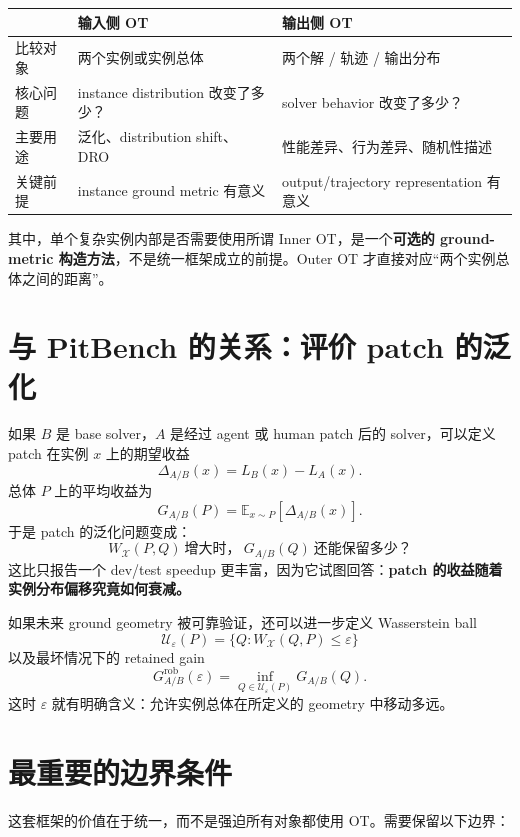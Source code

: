 \documentclass[11pt,a4paper]{ctexart}
\begin{document}
\begin{center}
\begin{tabular}{>{\raggedright\arraybackslash}p{3.2cm} >{\raggedright\arraybackslash}p{5.1cm} >{\raggedright\arraybackslash}p{5.1cm}}
\toprule
 & 输入侧 OT & 输出侧 OT \\
\midrule
比较对象 & 两个实例或实例总体 & 两个解 / 轨迹 / 输出分布 \\
核心问题 & instance distribution 改变了多少？ & solver behavior 改变了多少？ \\
主要用途 & 泛化、distribution shift、DRO & 性能差异、行为差异、随机性描述 \\
关键前提 & instance ground metric 有意义 & output/trajectory representation 有意义 \\
\bottomrule
\end{tabular}
\end{center}

其中，单个复杂实例内部是否需要使用所谓 Inner OT，是一个\textbf{可选的 ground-metric 构造方法}，不是统一框架成立的前提。Outer OT 才直接对应“两个实例总体之间的距离”。

\section{与 PitBench 的关系：评价 patch 的泛化}

如果 $B$ 是 base solver，$A$ 是经过 agent 或 human patch 后的 solver，可以定义 patch 在实例 $x$ 上的期望收益
\[
\Delta_{A/B}(x)
=
L_B(x)-L_A(x).
\]
总体 $P$ 上的平均收益为
\[
G_{A/B}(P)
=
\mathbb E_{x\sim P}[\Delta_{A/B}(x)].
\]
于是 patch 的泛化问题变成：
\[
\boxed{
W_{\mathcal X}(P,Q)\ \text{增大时，}\ G_{A/B}(Q)\ \text{还能保留多少？}
}
\]
这比只报告一个 dev/test speedup 更丰富，因为它试图回答：\textbf{patch 的收益随着实例分布偏移究竟如何衰减。}

如果未来 ground geometry 被可靠验证，还可以进一步定义 Wasserstein ball
\[
\mathcal U_\varepsilon(P)
=
\{Q:W_{\mathcal X}(Q,P)\le \varepsilon\}
\]
以及最坏情况下的 retained gain
\[
G_{A/B}^{\mathrm{rob}}(\varepsilon)
=
\inf_{Q\in\mathcal U_\varepsilon(P)}G_{A/B}(Q).
\]
这时 $\varepsilon$ 就有明确含义：允许实例总体在所定义的 geometry 中移动多远。

\section{最重要的边界条件}

这套框架的价值在于统一，而不是强迫所有对象都使用 OT。需要保留以下边界：
\end{document}
